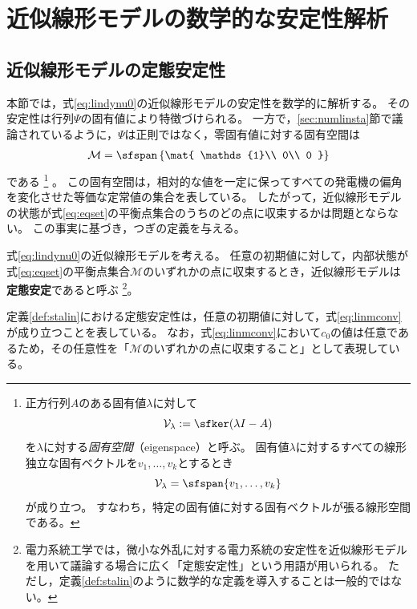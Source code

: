 \documentclass[tombow,dvipdfmx]{corona-a5-1.1}
\begin{document}
\section{近似線形モデルの数学的な安定性解析\advanced}\label{sec:linmathana}

\subsection{近似線形モデルの定態安定性\advanced}

本節では，式\ref{eq:lindynu0}の近似線形モデルの安定性を数学的に解析する。
その安定性は行列$\Psi$の固有値により特徴づけられる。
一方で，\ref{sec:numlinsta}節で議論されているように，$\Psi$は正則ではなく，零固有値に対する固有空間は
\begin{align}\label{eq:eqset}
\mathcal{M} =
 \sfspan\left\{
 \mat{
 \mathds{1}\\
 0\\
 0
 }
 \right\}
\end{align}
である
\footnote{
正方行列$A$のある固有値$\lambda$に対して
\[
\mathcal{V}_{\lambda}:= \sfker (\lambda I -A)
\]
を$\lambda$に対する\emph{固有空間}（eigenspace）と呼ぶ。
固有値$\lambda$に対するすべての線形独立な固有ベクトルを$v_1,\ldots,v_k$とするとき
\[
\mathcal{V}_{\lambda} = \sfspan\{v_1,\ldots,v_k\}
\]
が成り立つ。
すなわち，特定の固有値に対する固有ベクトルが張る線形空間である。
}
。
この固有空間は，相対的な値を一定に保ってすべての発電機の偏角を変化させた等価な定常値の集合を表している。
したがって，近似線形モデルの状態が式\ref{eq:eqset}の平衡点集合のうちのどの点に収束するかは問題とならない。
この事実に基づき，つぎの定義を与える。

\begin{定義}[近似線形モデルの定態安定性]
\label{def:stalin}
式\ref{eq:lindynu0}の近似線形モデルを考える。
任意の初期値に対して，内部状態が式\ref{eq:eqset}の平衡点集合$\mathcal{M}$のいずれかの点に収束するとき，近似線形モデルは\textbf{定態安定}であると呼ぶ
\footnote{
電力系統工学では，微小な外乱に対する電力系統の安定性を近似線形モデルを用いて議論する場合に広く「定態安定性」という用語が用いられる。
ただし，定義\ref{def:stalin}のように数学的な定義を導入することは一般的ではない。
}。
\end{定義}

定義\ref{def:stalin}における定態安定性は，任意の初期値に対して，式\ref{eq:linmconv}が成り立つことを表している。
なお，式\ref{eq:linmconv}において$c_0$の値は任意であるため，その任意性を「$\mathcal{M}$のいずれかの点に収束すること」として表現している。
\end{document}
